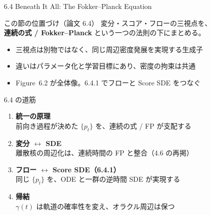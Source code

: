 

\begin{frame}{6.4 Beneath It All: The Fokker--Planck Equation}
    \begin{block}{この節の位置づけ（論文 6.4）}
        変分・スコア・フローの三視点を、\\
        \textbf{連続の式 / Fokker--Planck} という一つの法則の下にまとめる。
    \end{block}
    \begin{itemize}
        \item 三視点は別物ではなく、同じ周辺密度発展を実現する生成子
        \item 違いはパラメータ化と学習目標にあり、密度の拘束は共通
        \item Figure~6.2 が全体像。6.4.1 でフローと Score SDE をつなぐ
    \end{itemize}
\end{frame}
\asmain
\begin{frame}{6.4 の道筋}
    \begin{enumerate}
        \item \textbf{統一の原理}\\
        前向き過程が決めた $\{p_t\}$ を、連続の式 / FP が支配する
        \item \textbf{変分 $\leftrightarrow$ SDE}\\
        離散核の周辺化は、連続時間の FP と整合（4.6 の再掲）
        \item \textbf{フロー $\leftrightarrow$ Score SDE（6.4.1）}\\
        同じ $\{p_t\}$ を、ODE と一群の逆時間 SDE が実現する
        \item \textbf{帰結}\\
        $\gamma(t)$ は軌道の確率性を変え、オラクル周辺は保つ
    \end{enumerate}
\end{frame}
